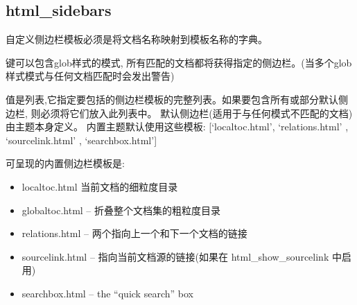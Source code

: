 \documentclass[a4paper,10pt,english]{sphinxmanual}
\begin{document}
\subsection{html\_sidebars}
\label{\detokenize{sphinx_conf:html-sidebars}}
\sphinxAtStartPar
自定义侧边栏模板必须是将文档名称映射到模板名称的字典。

\sphinxAtStartPar
键可以包含glob样式的模式, 所有匹配的文档都将获得指定的侧边栏。(当多个glob样式模式与任何文档匹配时会发出警告)

\sphinxAtStartPar
值是列表,它指定要包括的侧边栏模板的完整列表。如果要包含所有或部分默认侧边栏, 则必须将它们放入此列表中。
默认侧边栏(适用于与任何模式不匹配的文档)由主题本身定义。
内置主题默认使用这些模板: {[}‘localtoc.html’, ‘relations.html’ , ‘sourcelink.html’ , ‘searchbox.html’{]}

\sphinxAtStartPar
可呈现的内置侧边栏模板是:
\begin{itemize}
\item {} 
\sphinxAtStartPar
localtoc.html \sphinxhyphen{} 当前文档的细粒度目录

\item {} 
\sphinxAtStartPar
globaltoc.html – 折叠整个文档集的粗粒度目录

\item {} 
\sphinxAtStartPar
relations.html – 两个指向上一个和下一个文档的链接

\item {} 
\sphinxAtStartPar
sourcelink.html – 指向当前文档源的链接(如果在 html\_show\_sourcelink 中启用)

\item {} 
\sphinxAtStartPar
searchbox.html – the “quick search” box

\end{itemize}

\begin{sphinxVerbatim}[commandchars=\\\{\}]
   
 \PYG{p}{[}  \PYG{p}{]}
 \PYG{p}{[} \PYG{p}{]}
\end{sphinxVerbatim}
\end{document}
